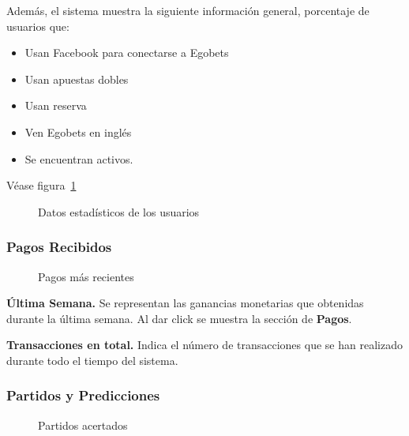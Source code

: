 Además, el sistema muestra la siguiente información general, porcentaje de usuarios que:
\begin{itemize}
	\item Usan Facebook \cite{facebookDocuWeb} para conectarse a Egobets
	\item Usan apuestas dobles
	\item Usan reserva
	\item Ven Egobets en inglés
	\item Se encuentran activos.
\end{itemize}
Véase figura~\ref{Fig:graficas-usuarios}
\begin{figure}[!htb]\centering
   \begin {minipage}{1\textwidth}
     \caption{Datos estadísticos de los usuarios}
	 \label{Fig:graficas-usuarios}
   \end{minipage}
\end{figure}
 
\subsubsection{Pagos Recibidos}

\begin{figure}[!htb]\centering
   \begin {minipage}{0.5\textwidth}
     \caption{Pagos más recientes}
	 \label{Fig:ultimos-pagos}
   \end{minipage}
\end{figure}

\textbf{Última Semana.}
Se representan las ganancias monetarias que obtenidas durante la última semana. Al dar click se muestra la sección de \textbf{Pagos}.

\textbf{Transacciones en total.}
Indica el número de transacciones que se han realizado durante todo el tiempo del sistema.

\subsubsection{Partidos y Predicciones}

\begin{figure}[!htb]\centering
   \begin {minipage}{0.5\textwidth}
     \caption{Partidos acertados}
	 \label{Fig:partidos-acertados}
   \end{minipage}
\end{figure}

